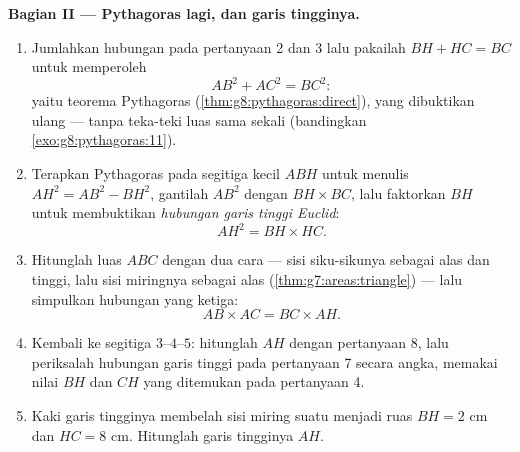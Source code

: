 \begin{problem}[{Soal akhir pekan --- garis tinggi segitiga
siku-siku: $AB^2 = BH \times BC$, $AH^2 = BH \times HC$, bukti kedua
Pythagoras, dan mesin untuk melukis akar kuadrat}]
\medskip
\noindent\textbf{Bagian II --- Pythagoras lagi, dan garis tingginya.}
\begin{enumerate}[resume]
  \item Jumlahkan hubungan pada pertanyaan 2 dan 3 lalu pakailah
        $BH + HC = BC$ untuk memperoleh
        \[
        AB^2 + AC^2 = BC^2 :
        \]
        yaitu teorema Pythagoras (\cref{thm:g8:pythagoras:direct}),
        yang dibuktikan ulang --- tanpa teka-teki luas sama sekali
        (bandingkan \cref{exo:g8:pythagoras:11}).
  \item Terapkan Pythagoras pada segitiga kecil $ABH$ untuk menulis
        $AH^2 = AB^2 - BH^2$, gantilah $AB^2$ dengan
        $BH \times BC$, lalu faktorkan $BH$ untuk membuktikan
        \emph{hubungan garis tinggi Euclid}:
        \[
        AH^2 = BH \times HC .
        \]
  \item Hitunglah luas $ABC$ dengan dua cara --- sisi siku-sikunya
        sebagai alas dan tinggi, lalu sisi miringnya sebagai alas
        (\cref{thm:g7:areas:triangle}) --- lalu simpulkan hubungan
        yang ketiga:
        \[
        AB \times AC = BC \times AH .
        \]
  \item Kembali ke segitiga $3$--$4$--$5$: hitunglah $AH$ dengan
        pertanyaan 8, lalu periksalah hubungan garis tinggi pada
        pertanyaan 7 secara angka, memakai nilai $BH$ dan $CH$ yang
        ditemukan pada pertanyaan 4.
  \item Kaki garis tingginya membelah sisi miring suatu  menjadi ruas $BH = 2$ cm dan $HC = 8$ cm.
        Hitunglah garis tingginya $AH$.
\end{enumerate}


\end{problem}
